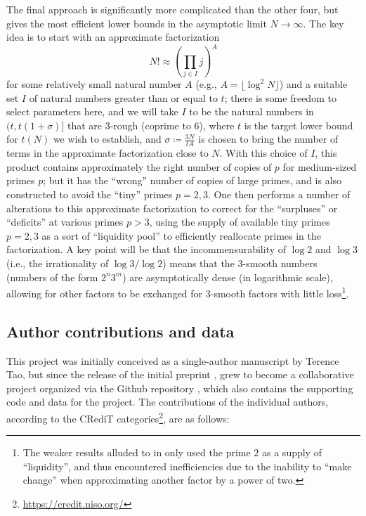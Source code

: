 \documentclass[12pt,a4paper,reqno]{amsart}
\numberwithin{equation}{section}
\theoremstyle{plain}
\theoremstyle{definition}
\begin{document}
The final approach is significantly more complicated than the other four, but gives the most efficient lower bounds in the asymptotic limit $N \to \infty$.  The key idea is to start with an approximate factorization
$$ N! \approx \left(\prod_{j \in I} j\right)^A$$
for some relatively small natural number $A$ (e.g., $A = \lfloor \log^2 N \rfloor$) and a suitable set $I$ of natural numbers greater than or equal to $t$; there is some freedom to select parameters here, and we will take $I$ to be the natural numbers in $(t, t(1+\sigma)]$ that are $3$-rough (coprime to $6$), where $t$ is the target lower bound for $t(N)$ we wish to establish, and $\sigma \coloneqq \frac{3N}{tA}$ is chosen to bring the number of terms in the approximate factorization close to $N$.  With this choice of $I$, this product contains approximately the right number of copies of $p$ for medium-sized primes $p$; but it has the ``wrong'' number of copies of large primes, and is also constructed to avoid the ``tiny'' primes $p=2,3$.  One then performs a number of alterations to this approximate factorization to correct for the ``surpluses'' or ``deficits'' at various primes $p>3$, using the supply of available tiny primes $p=2,3$ as a sort of ``liquidity pool'' to efficiently reallocate primes in the factorization.  A key point will be that the incommensurability of $\log 2$ and $\log 3$ (i.e., the irrationality of $\log 3/\log 2$) means that the $3$-smooth numbers (numbers of the form $2^n 3^m$) are asymptotically dense (in logarithmic scale), allowing for other factors to be exchanged for $3$-smooth factors with little loss\footnote{The weaker results alluded to in  only used the prime $2$ as a supply of ``liquidity'', and thus encountered inefficiencies due to the inability to ``make change'' when approximating another factor by a power of two.}.




\subsection{Author contributions and data}

This project was initially conceived as a single-author manuscript by Terence Tao, but since the release of the initial preprint \cite{tao}, grew to become a collaborative project organized via the Github repository \cite{github}, which also contains the supporting code and data for the project.  The contributions of the individual authors, according to the CRediT categories\footnote{\url{https://credit.niso.org/}}, are as follows:
\end{document}

